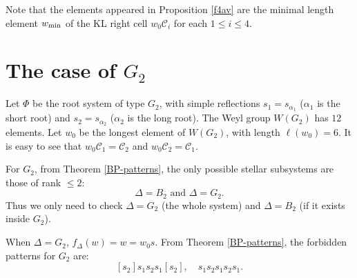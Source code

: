 \documentclass[11pt, reqno]{amsart}
\renewcommand{\subset}{\subseteq}
\theoremstyle{definition}
\numberwithin{equation}{section}
\begin{document}
Note that the elements appeared in Proposition \ref{f4av} are the minimal length element $w_{\rm min}$ of the KL right cell $w_0\mathcal{C}_i$ for each $1\leq i\leq 4$.

\section{The case of $G_2$}\label{typeg2}

Let $\Phi$ be the root system of type $G_2$, with simple reflections $s_1=s_{\alpha_1}$ ($ \alpha_1$ is the short root) and $s_2=s_{\alpha_2}$ ($\alpha_2$ is the long root). The Weyl group $W(G_2)$ has $12$ elements. Let $w_0$ be the longest element of $W(G_2)$, with length $\ell(w_0)=6$. It is easy to see that $w_0\mathcal{C}_1=\mathcal{C}_2$ and $w_0\mathcal{C}_2=\mathcal{C}_1$.


For $G_2$, from Theorem \ref{BP-patterns}, the only possible stellar subsystems are those of rank $\le 2$:\[\Delta = B_2\text{ and } \Delta = G_2.\]
Thus we only need to check $\Delta = G_2$ (the whole system) and $\Delta = B_2$ (if it exists inside $G_2$).

When $\Delta = G_2$, $f_\Delta(w) = w = w_0 s$. From Theorem \ref{BP-patterns}, the forbidden patterns for $G_2$ are:\[[s_2]s_1 s_2 s_1 [s_2],\quad s_1 s_2 s_1 s_2 s_1.\]





\end{document}
